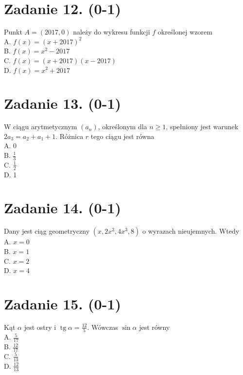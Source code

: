 \documentclass[10pt]{article}
\begin{document}
\section*{Zadanie 12. (0-1)}
Punkt \(A=(2017,0)\) należy do wykresu funkcji \(f\) określonej wzorem\\
A. \(f(x)=(x+2017)^{2}\)\\
B. \(f(x)=x^{2}-2017\)\\
C. \(f(x)=(x+2017)(x-2017)\)\\
D. \(f(x)=x^{2}+2017\)

\section*{Zadanie 13. (0-1)}
W ciągu arytmetycznym \(\left(a_{n}\right)\), określonym dla \(n \geq 1\), spełniony jest warunek \(2 a_{3}=a_{2}+a_{1}+1\). Różnica \(r\) tego ciągu jest równa\\
A. 0\\
B. \(\frac{1}{3}\)\\
C. \(\frac{1}{2}\)\\
D. 1

\section*{Zadanie 14. (0-1)}
Dany jest ciąg geometryczny \(\left(x, 2 x^{2}, 4 x^{3}, 8\right)\) o wyrazach nieujemnych. Wtedy\\
A. \(x=0\)\\
B. \(x=1\)\\
C. \(x=2\)\\
D. \(x=4\)

\section*{Zadanie 15. (0-1)}
Kąt \(\alpha\) jest ostry i \(\operatorname{tg} \alpha=\frac{12}{5}\). Wówczas \(\sin \alpha\) jest równy\\
A. \(\frac{5}{17}\)\\
B. \(\frac{12}{17}\)\\
C. \(\frac{5}{13}\)\\
D. \(\frac{12}{13}\)
\end{document}
